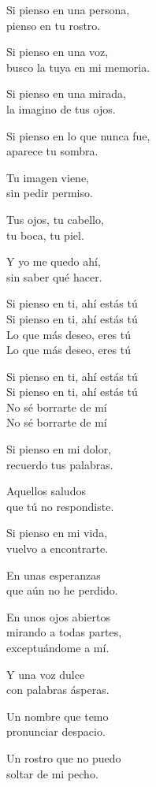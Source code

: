 \begin{lyrics}

Si pienso en una persona,\\
pienso en tu rostro.

Si pienso en una voz,\\
busco la tuya en mi memoria.

Si pienso en una mirada,\\
la imagino de tus ojos.

Si pienso en lo que nunca fue,\\
aparece tu sombra.

Tu imagen viene,\\
sin pedir permiso.

Tus ojos, tu cabello,\\
tu boca, tu piel.

Y yo me quedo ahí,\\
sin saber qué hacer.

Si pienso en ti, ahí estás tú\\
Si pienso en ti, ahí estás tú\\
Lo que más deseo, eres tú\\
Lo que más deseo, eres tú

Si pienso en ti, ahí estás tú\\
Si pienso en ti, ahí estás tú\\
No sé borrarte de mí\\
No sé borrarte de mí

Si pienso en mi dolor,\\
recuerdo tus palabras.

Aquellos saludos\\
que tú no respondiste.

Si pienso en mi vida,\\
vuelvo a encontrarte.

En unas esperanzas\\
que aún no he perdido.

En unos ojos abiertos\\
mirando a todas partes,\\
exceptuándome a mí.

Y una voz dulce\\
con palabras ásperas.

Un nombre que temo\\
pronunciar despacio.

Un rostro que no puedo\\
soltar de mi pecho.


\end{lyrics}
